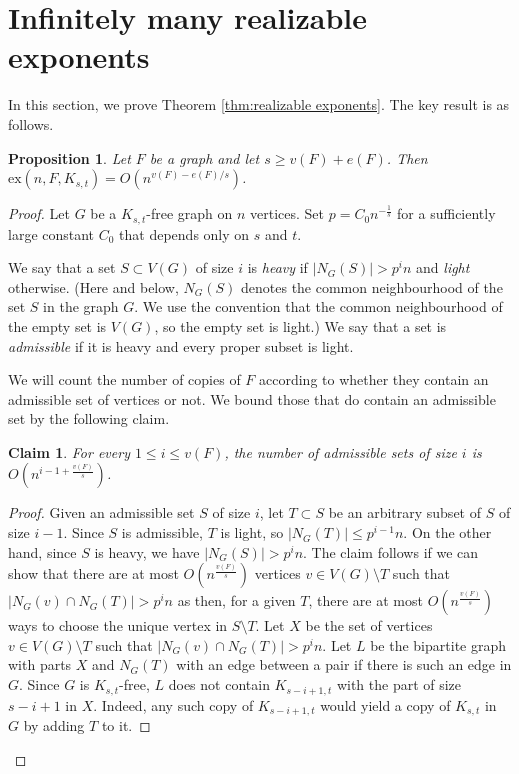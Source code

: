 \documentclass[12pt]{article}
\newtheorem{proposition}[theorem]{Proposition}
\newtheorem{claim}[theorem]{Claim}
\newcommand{\ex}{\mathrm{ex}}
\begin{document}
 


\section{Infinitely many realizable exponents} \label{sec:realizable exponents}



In this section, we prove Theorem \ref{thm:realizable exponents}. The key result is as follows.

\begin{proposition} \label{prop:realizable upper bound}
    Let $F$ be a graph and let $s\geq v(F) + e(F)$. Then $\ex(n,F,K_{s,t})=O(n^{v(F)-e(F)/s})$.
\end{proposition}

    \begin{proof}

        

        Let $G$ be a $K_{s, t}$-free graph on $n$ vertices. Set $p = C_0n^{-\frac{1}{s}}$ for a sufficiently large constant $C_0$ that depends only on $s$ and $t$. 

        We say that a set $S\subset V(G)$ of size $i$ is \emph{heavy} if $|N_G(S)| > p^in$ and \emph{light} otherwise. (Here and below, $N_G(S)$ denotes the common neighbourhood of the set $S$ in the graph $G$. We use the convention that the common neighbourhood of the empty set is $V(G)$, so the empty set is light.) We say that a set is \emph{admissible} if it is heavy and every proper subset is light. 

        We will count the number of copies of $F$ according to whether they contain an admissible set of vertices or not. We bound those that do contain an admissible set by the following claim.

        \begin{claim} \label{claim:few admissible}
            For every $1\leq i \leq v(F)$, the number of admissible sets of size $i$ is $O(n^{i - 1 + \frac{v(F)}{s}})$. 
        \end{claim}
        \begin{proof}
            Given an admissible set $S$ of size $i$, let $T\subset S$ be an arbitrary subset of $S$ of size $i-1$. Since $S$ is admissible, $T$ is light, so $|N_G(T)|\leq p^{i-1}n$. On the other hand, since $S$ is heavy, we have $|N_G(S)|>p^i n$. The claim follows if we can show that there are at most $O(n^{\frac{v(F)}{s}})$ vertices $v\in V(G)\setminus T$ such that $|N_G(v) \cap N_G(T)| > p^i n$ as then, for a given $T$, there are at most $O(n^{\frac{v(F)}{s}})$ ways to choose the unique vertex in $S\setminus T$. Let $X$ be the set of vertices $v\in V(G)\setminus T$ such that $|N_G(v) \cap N_G(T)| > p^i n$. Let $L$ be the bipartite graph with parts $X$ and $N_G(T)$ with an edge between a pair if there is such an edge in $G$. Since $G$ is $K_{s, t}$-free, $L$ does not contain $K_{s-i+1,t}$ with the part of size $s-i+1$ in $X$. Indeed, any such copy of $K_{s-i+1,t}$ would yield a copy of $K_{s,t}$ in $G$ by adding $T$ to it.


\end{proof}
\end{proof}
\end{document}
